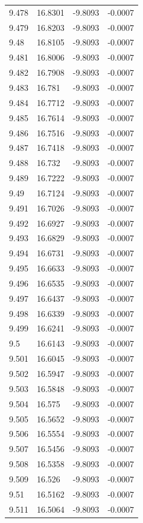 \begin{tabular}{llll}
9.478 & 16.8301 & -9.8093 & -0.0007 \\
9.479 & 16.8203 & -9.8093 & -0.0007 \\
9.48 & 16.8105 & -9.8093 & -0.0007 \\
9.481 & 16.8006 & -9.8093 & -0.0007 \\
9.482 & 16.7908 & -9.8093 & -0.0007 \\
9.483 & 16.781 & -9.8093 & -0.0007 \\
9.484 & 16.7712 & -9.8093 & -0.0007 \\
9.485 & 16.7614 & -9.8093 & -0.0007 \\
9.486 & 16.7516 & -9.8093 & -0.0007 \\
9.487 & 16.7418 & -9.8093 & -0.0007 \\
9.488 & 16.732 & -9.8093 & -0.0007 \\
9.489 & 16.7222 & -9.8093 & -0.0007 \\
9.49 & 16.7124 & -9.8093 & -0.0007 \\
9.491 & 16.7026 & -9.8093 & -0.0007 \\
9.492 & 16.6927 & -9.8093 & -0.0007 \\
9.493 & 16.6829 & -9.8093 & -0.0007 \\
9.494 & 16.6731 & -9.8093 & -0.0007 \\
9.495 & 16.6633 & -9.8093 & -0.0007 \\
9.496 & 16.6535 & -9.8093 & -0.0007 \\
9.497 & 16.6437 & -9.8093 & -0.0007 \\
9.498 & 16.6339 & -9.8093 & -0.0007 \\
9.499 & 16.6241 & -9.8093 & -0.0007 \\
9.5 & 16.6143 & -9.8093 & -0.0007 \\
9.501 & 16.6045 & -9.8093 & -0.0007 \\
9.502 & 16.5947 & -9.8093 & -0.0007 \\
9.503 & 16.5848 & -9.8093 & -0.0007 \\
9.504 & 16.575 & -9.8093 & -0.0007 \\
9.505 & 16.5652 & -9.8093 & -0.0007 \\
9.506 & 16.5554 & -9.8093 & -0.0007 \\
9.507 & 16.5456 & -9.8093 & -0.0007 \\
9.508 & 16.5358 & -9.8093 & -0.0007 \\
9.509 & 16.526 & -9.8093 & -0.0007 \\
9.51 & 16.5162 & -9.8093 & -0.0007 \\
9.511 & 16.5064 & -9.8093 & -0.0007 \\

\end{tabular}
